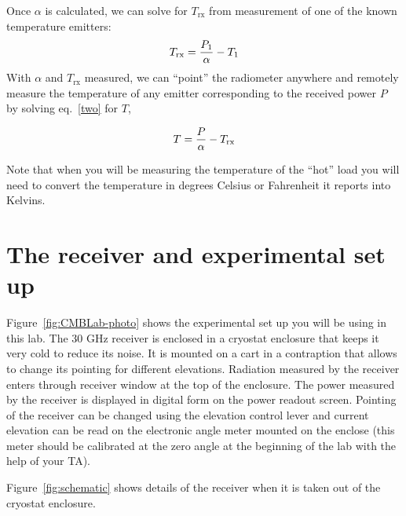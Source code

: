 Once $\alpha$ is calculated, we can solve for $T_\textrm{rx}$ from measurement of one of the known temperature emitters:
\begin{equation}
T_\textrm{rx} = {P_1 \over \alpha} -T_1
\label{four}
\end{equation}
With $\alpha$ and $T_\textrm{rx}$ measured, we can ``point'' the radiometer anywhere and remotely measure the temperature of any emitter corresponding to the received power $P$ by solving eq.~\ref{two}  for $T$,

\begin{equation}
T={P\over \alpha} - T_\textrm{rx}
\label{five}
\end{equation}

Note that when you will be measuring the temperature of the ``hot'' load you will need to convert the temperature in degrees Celsius or Fahrenheit it reports into Kelvins.

\section{The receiver and experimental set up}

Figure~\ref{fig:CMBLab-photo} shows the experimental set up you will be using in this lab. The 30 GHz receiver is enclosed in a cryostat enclosure that keeps it very cold to reduce its noise. It is mounted on a cart in a contraption that allows to change its pointing for different elevations. Radiation measured by the receiver enters through receiver window at the top of the enclosure. The power measured by the receiver is displayed in digital form on the power readout screen. Pointing of the receiver can be changed using the elevation control lever and current elevation can be read on the electronic angle meter mounted on the enclose (this meter should be calibrated at the zero angle at the beginning of the lab with the help of your TA).

Figure~\ref{fig:schematic} shows details of the receiver when it is taken out of the cryostat enclosure.

